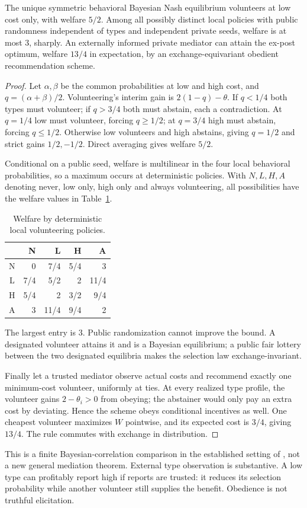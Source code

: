 \begin{theorem}\label{result:04-bayesian-1}
The unique symmetric behavioral Bayesian Nash equilibrium volunteers at low
cost only, with welfare $5/2$. Among all possibly distinct local policies with
public randomness independent of types and independent private seeds, welfare
is at most $3$, sharply. An externally informed private mediator can attain
the ex-post optimum, welfare $13/4$ in expectation, by an exchange-equivariant
obedient recommendation scheme.
\end{theorem}
\begin{proof}
Let $\alpha,\beta$ be the common probabilities at low and high cost, and
$q=(\alpha+\beta)/2$. Volunteering's interim gain is $2(1-q)-\theta$.
If $q<1/4$ both types must volunteer; if $q>3/4$ both must abstain, each a
contradiction. At $q=1/4$ low must volunteer, forcing $q\ge1/2$; at $q=3/4$
high must abstain, forcing $q\le1/2$. Otherwise low volunteers and high
abstains, giving $q=1/2$ and strict gains $1/2,-1/2$. Direct averaging gives
welfare $5/2$.

Conditional on a public seed, welfare is multilinear in the four local
behavioral probabilities, so a maximum occurs at deterministic policies.
With $N,L,H,A$ denoting never, low only, high only and always volunteering,
all possibilities have the welfare values in Table~\ref{tab:volunteer-welfare}.
\begin{table}[htbp]
\centering
\caption{Welfare by deterministic local volunteering policies.}\label{tab:volunteer-welfare}
\begin{tabular}{crrrr}
\toprule
 &N&L&H&A\\
\midrule
N&0&7/4&5/4&3\\
L&7/4&5/2&2&11/4\\
H&5/4&2&3/2&9/4\\
A&3&11/4&9/4&2\\
\bottomrule
\end{tabular}
\end{table}
The largest entry is $3$. Public randomization cannot improve the bound.
A designated volunteer attains it and is a Bayesian equilibrium; a public
fair lottery between the two designated equilibria makes the selection law
exchange-invariant.

Finally let a trusted mediator observe actual costs and recommend exactly one
minimum-cost volunteer, uniformly at ties. At every realized type profile,
the volunteer gains $2-\theta_i>0$ from obeying; the abstainer would only
pay an extra cost by deviating. Hence the scheme obeys conditional incentives
as well. One cheapest volunteer maximizes $W$ pointwise, and its expected
cost is $3/4$, giving $13/4$. The rule commutes with exchange in distribution.
\end{proof}
This is a finite Bayesian-correlation comparison in the established setting
of \citet{bergemann2016}, not a new general mediation theorem. External type
observation is substantive. A low type can profitably report high if reports
are trusted: it reduces its selection probability while another volunteer
still supplies the benefit. Obedience is not truthful elicitation.

